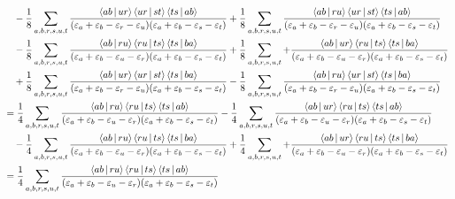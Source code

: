 \documentclass[a4paper]{article}
\numberwithin{equation}{subsection}
\begin{document}
\begin{align}
&\quad{} - \dfrac{1}{8} \sum_{a,b,r,s,u,t} \dfrac{\Braket{ab|ur} \Braket{ur|st} \Braket{ts|ab}}{(\varepsilon_a + \varepsilon_b - \varepsilon_r - \varepsilon_u)(\varepsilon_a + \varepsilon_b - \varepsilon_s - \varepsilon_t)} 
+ \dfrac{1}{8} \sum_{a,b,r,s,u,t} \dfrac{\Braket{ab|ru} \Braket{ur|st} \Braket{ts|ab}}{(\varepsilon_a + \varepsilon_b - \varepsilon_r - \varepsilon_u)(\varepsilon_a + \varepsilon_b - \varepsilon_s - \varepsilon_t)} 
\notag\\
&\quad{} - \dfrac{1}{8} \sum_{a,b,r,s,u,t} \dfrac{\Braket{ab|ru} \Braket{ru|ts} \Braket{ts|ba}}{(\varepsilon_a + \varepsilon_b - \varepsilon_u - \varepsilon_r)(\varepsilon_a + \varepsilon_b - \varepsilon_s - \varepsilon_t)} 
+ \dfrac{1}{8} \sum_{a,b,r,s,u,t} + \dfrac{\Braket{ab|ur} \Braket{ru|ts} \Braket{ts|ba}}{(\varepsilon_a + \varepsilon_b - \varepsilon_u - \varepsilon_r)(\varepsilon_a + \varepsilon_b - \varepsilon_s - \varepsilon_t)} \notag\\
&\quad{} + \dfrac{1}{8} \sum_{a,b,r,s,u,t} \dfrac{\Braket{ab|ur} \Braket{ur|st} \Braket{ts|ba}}{(\varepsilon_a + \varepsilon_b - \varepsilon_r - \varepsilon_u)(\varepsilon_a + \varepsilon_b - \varepsilon_s - \varepsilon_t)} 
- \dfrac{1}{8} \sum_{a,b,r,s,u,t} \dfrac{\Braket{ab|ru} \Braket{ur|st} \Braket{ts|ba}}{(\varepsilon_a + \varepsilon_b - \varepsilon_r - \varepsilon_u)(\varepsilon_a + \varepsilon_b - \varepsilon_s - \varepsilon_t)}  \notag\\
&= \dfrac{1}{4} \sum_{a,b,r,s,u,t} \dfrac{\Braket{ab|ru} \Braket{ru|ts} \Braket{ts|ab}}{(\varepsilon_a + \varepsilon_b - \varepsilon_u - \varepsilon_r)(\varepsilon_a + \varepsilon_b - \varepsilon_s - \varepsilon_t)} 
- \dfrac{1}{4} \sum_{a,b,r,s,u,t} \dfrac{\Braket{ab|ur} \Braket{ru|ts} \Braket{ts|ab}}{(\varepsilon_a + \varepsilon_b - \varepsilon_u - \varepsilon_r)(\varepsilon_a + \varepsilon_b - \varepsilon_s - \varepsilon_t)} \notag\\
&\quad{} - \dfrac{1}{4} \sum_{a,b,r,s,u,t} \dfrac{\Braket{ab|ru} \Braket{ru|ts} \Braket{ts|ba}}{(\varepsilon_a + \varepsilon_b - \varepsilon_u - \varepsilon_r)(\varepsilon_a + \varepsilon_b - \varepsilon_s - \varepsilon_t)} 
+ \dfrac{1}{4} \sum_{a,b,r,s,u,t} + \dfrac{\Braket{ab|ur} \Braket{ru|ts} \Braket{ts|ba}}{(\varepsilon_a + \varepsilon_b - \varepsilon_u - \varepsilon_r)(\varepsilon_a + \varepsilon_b - \varepsilon_s - \varepsilon_t)} \notag\\
&= \dfrac{1}{4} \sum_{a,b,r,s,u,t} \dfrac{\Braket{ab|ru} \Braket{ru|ts} \Braket{ts|ab}}{(\varepsilon_a + \varepsilon_b - \varepsilon_u - \varepsilon_r)(\varepsilon_a + \varepsilon_b - \varepsilon_s - \varepsilon_t)} 

\end{align}
\end{document}
